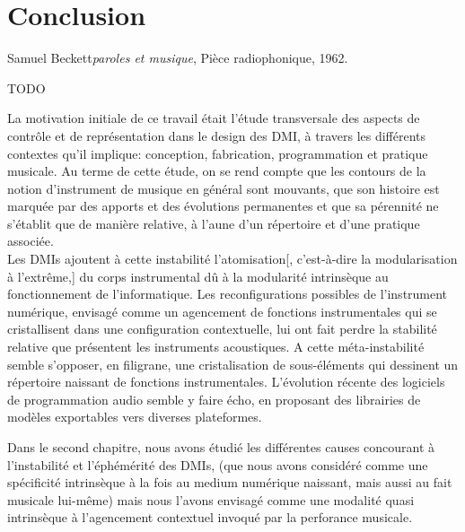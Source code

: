 %
\chapter{Conclusion}
\label{ch:conclusion}

{Samuel Beckett}{\textit{paroles et musique}, Pièce radiophonique, 1962. \cite{beckett_comeet_2014}}

TODO

\noindent La motivation initiale de ce travail était l'étude transversale des aspects de contrôle et de représentation dans le design des \gls{DMI}, à travers les différents contextes qu'il implique: conception, fabrication, programmation et pratique musicale. Au terme de cette étude, on se rend compte que les contours de la notion d'instrument de musique en général sont mouvants, que son histoire est marquée par des apports et des évolutions permanentes et que sa pérennité ne s'établit que de manière relative, à l'aune d'un répertoire et d'une pratique associée.\\

\indent Les \glspl{DMI} ajoutent à cette instabilité l'atomisation[, c'est-à-dire la modularisation à l'extrême,] du corps instrumental dû à la modularité intrinsèque au fonctionnement de l'informatique. Les reconfigurations possibles de l'instrument numérique, envisagé comme un agencement de fonctions instrumentales qui se cristallisent dans une configuration contextuelle, lui ont fait perdre la stabilité relative que présentent les instruments acoustiques. A cette méta-instabilité semble s'opposer, en filigrane, une cristalisation de sous-éléments qui dessinent un répertoire naissant de fonctions instrumentales. 
L'évolution récente des logiciels de programmation audio semble y faire écho, en proposant des librairies de modèles exportables vers diverses plateformes.


Dans le second chapitre, nous avons étudié les différentes causes concourant à l'instabilité et l'éphémérité des \glspl{DMI}, (que nous avons considéré comme une spécificité intrinsèque à la fois au  medium numérique naissant, mais aussi au fait musicale lui-même) mais nous l'avons envisagé comme une modalité quasi intrinsèque à l'agencement contextuel invoqué par la perforance musicale.

